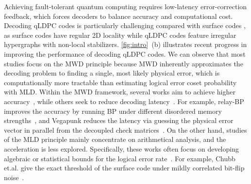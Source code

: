 
Achieving fault-tolerant quantum computing requires low-latency error-correction feedback, which forces decoders to balance accuracy and computational cost. Decoding qLDPC codes is particularly challenging compared with surface codes \cite{bpgdg,wolanski2024ambiguity,maan2025machine,ninkovic2024decoding,yin2024symbreak}, as surface codes have regular 2D locality while qLDPC codes feature irregular hypergraphs with non-local stabilizers. \autoref{fig:intro}~(b) illustrates recent progress in improving the performance of decoding qLDPC codes. We can observe that most studies focus on the MWD principle because MWD inherently approximates the decoding problem to finding a single, most likely physical error, which is computationally more tractable than estimating logical error coset probability with MLD. 
Within the MWD framework, several works aim to achieve higher accuracy~\cite{bposd,muller2025improved}, while others seek to reduce decoding latency~\cite{bplsd,zhou2025vegapunk,yin2024symbreak}. For example, relay-BP improves the accuracy by running BP under different disordered memory strengths~\cite{muller2025improved}, and Vegapunk reduces the latency via guessing the physical error vector in parallel from the decoupled check matrices~\cite{zhou2025vegapunk}. On the other hand, studies of the MLD principle mainly concentrate on arithmetical analysis, and the acceleration is less explored. Specifically, these works often focus on developing algebraic or statistical bounds for the logical error rate~\cite{chubb2021statistical,
xu2024constant,jung2020quantum}. 
For example, Chubb et.al. give the exact threshold of the surface code under mildly correlated bit-flip noise~\cite{chubb2021statistical}.




